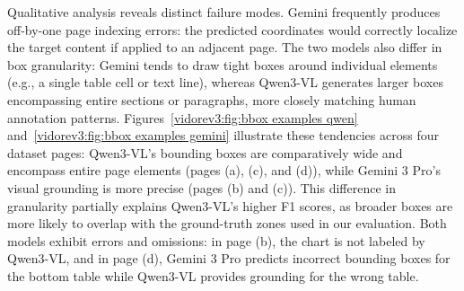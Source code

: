 Qualitative analysis reveals distinct failure modes. Gemini frequently produces off-by-one page indexing errors: the predicted coordinates would correctly localize the target content if applied to an adjacent page. The two models also differ in box granularity: Gemini tends to draw tight boxes around individual elements (e.g., a single table cell or text line), whereas Qwen3-VL generates larger boxes encompassing entire sections or paragraphs, more closely matching human annotation patterns. Figures~\ref{vidorev3:fig:bbox examples qwen} and~\ref{vidorev3:fig:bbox examples gemini} illustrate these tendencies across four dataset pages: Qwen3-VL's bounding boxes are comparatively wide and encompass entire page elements (pages (a), (c), and (d)), while Gemini 3 Pro's visual grounding is more precise (pages (b) and (c)). This difference in granularity partially explains Qwen3-VL's higher F1 scores, as broader boxes are more likely to overlap with the ground-truth zones used in our evaluation. Both models exhibit errors and omissions: in page (b), the chart is not labeled by Qwen3-VL, and in page (d), Gemini 3 Pro predicts incorrect bounding boxes for the bottom table while Qwen3-VL provides grounding for the wrong table.



